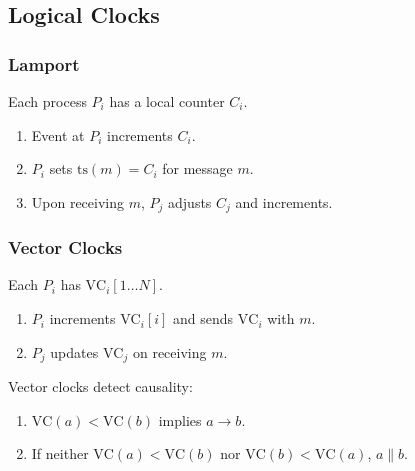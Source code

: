 \subsection{Logical Clocks}
\subsubsection{Lamport}
 Each process \( P_i \) has a local counter \( C_i \).
    \begin{enumerate}
        \item Event at \( P_i \) increments \( C_i \).
        \item \( P_i \) sets \( \text{ts}(m) = C_i \) for message \( m \).
        \item Upon receiving \( m \), \( P_j \) adjusts \( C_j \) and increments.
    \end{enumerate}


\subsubsection{Vector Clocks}
 Each \( P_i \) has \( \text{VC}_i[1 \ldots N] \).
    \begin{enumerate}
        \item \( P_i \) increments \( \text{VC}_i[i] \) and sends \( \text{VC}_i \) with \( m \).
        \item \( P_j \) updates \( \text{VC}_j \) on receiving \( m \).
    \end{enumerate}
 Vector clocks detect causality:
    \begin{enumerate}
        \item \( \text{VC}(a) < \text{VC}(b) \) implies \( a \rightarrow b \).
        \item If neither \( \text{VC}(a) < \text{VC}(b) \) nor \( \text{VC}(b) < \text{VC}(a) \), \( a \parallel b \).
    \end{enumerate}

